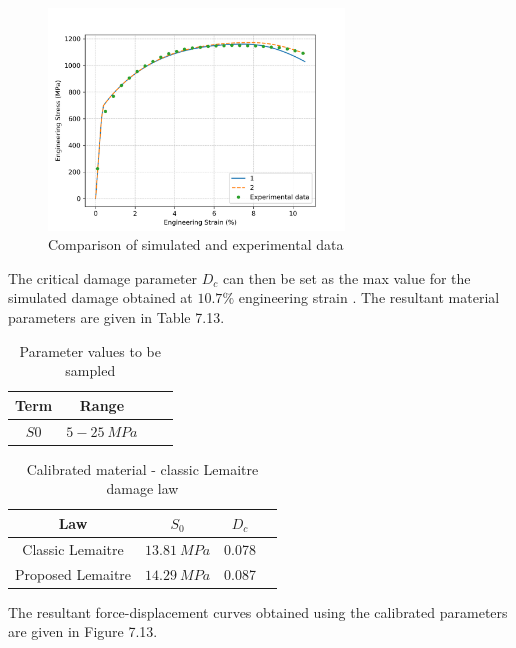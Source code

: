 \documentclass[sn-mathphys,Numbered,draft]{sn-jnl}%
\begin{document}
\begin{figure}[htb]
\begin{center}
	\includegraphics[width=0.7\textwidth]{./Figures/SimulationAndAnalysis/compareExperimentalSimulation/compareNecking.png}
\caption{Comparison of simulated and experimental data}
\label{fig:notchedRoundBAr}
\end{center}
\end{figure}

The critical damage parameter $D_c$ can then be set as the max value for the simulated damage obtained at $10.7 \%$ engineering strain \cite{malcher_continuum_2012}. The resultant material parameters are given in Table 7.13. 

\begin{table}[htb]
	\centering
		\begin{tabular}{cccc} \hline
			Term  & Range \\ \hline 
             $S0$ & $5-25\ MPa$ \\
			\hline
		\end{tabular}
	\caption{Parameter values to be sampled}
	\label{tab:material_properties}
\end{table}


\begin{table}[htb]
	\centering
		\begin{tabular}{cccc} \hline
			Law & $S_0$ &  $D_c$ \\ \hline 
             Classic Lemaitre & $13.81\ MPa$ & 0.078 \\
    		Proposed Lemaitre & $14.29\ MPa$ & 0.087   \\
			\hline
		\end{tabular}
	\caption{Calibrated material - classic Lemaitre damage law}
	\label{tab:material_properties}
\end{table}

The resultant force-displacement curves obtained using the calibrated parameters are given in Figure 7.13.
\end{document}

